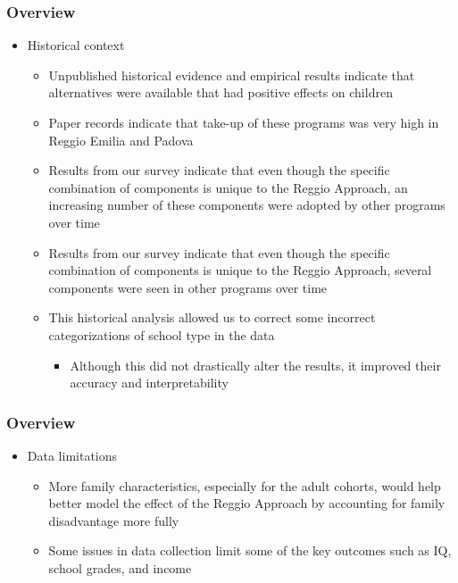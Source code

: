 \documentclass[static]{JJH-Beamer_PAGENOS}
\begin{document}
\begin{frame}
\frametitle{Overview}
\begin{itemize}
	\item Historical context
	\begin{itemize}
		\item Unpublished historical evidence and empirical results indicate that alternatives were available that had positive effects on children
		\item Paper records indicate that take-up of these programs was very high in Reggio Emilia and Padova
		\item Results from our survey indicate that even though the specific combination of components is unique to the Reggio Approach, an increasing number of these components were adopted by other programs over time
		\item Results from our survey indicate that even though the specific combination of components is unique to the Reggio Approach, several components were seen in other programs over time
		\item This historical analysis allowed us to correct some incorrect categorizations of school type in the data
		\begin{itemize}
			\item Although this did not drastically alter the results, it improved their accuracy and interpretability
		\end{itemize}
	\end{itemize}
\end{itemize}
\end{frame}

\begin{frame}
\frametitle{Overview}
\begin{itemize}
	\item Data limitations
	\begin{itemize}
		\item More family characteristics, especially for the adult cohorts, would help better model the effect of the Reggio Approach by accounting for family disadvantage more fully
		\item Some issues in data collection limit some of the key outcomes such as IQ, school grades, and income
	\end{itemize}
\end{itemize}
\end{frame}
\end{document}
